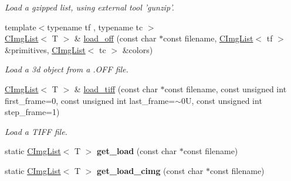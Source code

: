 \begin{DoxyCompactItemize}
\begin{DoxyCompactList}\small\item\em Load a gzipped list, using external tool 'gunzip'. \item\end{DoxyCompactList}\item 
\hypertarget{structcimg__library_1_1CImgList_abf3317799008103e710d328b5f297407}{
{\footnotesize template$<$typename tf , typename tc $>$ }\\\hyperlink{structcimg__library_1_1CImgList}{CImgList}$<$ T $>$ \& \hyperlink{structcimg__library_1_1CImgList_abf3317799008103e710d328b5f297407}{load\_\-off} (const char $\ast$const filename, \hyperlink{structcimg__library_1_1CImgList}{CImgList}$<$ tf $>$ \&primitives, \hyperlink{structcimg__library_1_1CImgList}{CImgList}$<$ tc $>$ \&colors)}
\label{structcimg__library_1_1CImgList_abf3317799008103e710d328b5f297407}

\begin{DoxyCompactList}\small\item\em Load a 3d object from a .OFF file. \item\end{DoxyCompactList}\item 
\hypertarget{structcimg__library_1_1CImgList_a9195765cb9bde15990a29ccd9306532c}{
\hyperlink{structcimg__library_1_1CImgList}{CImgList}$<$ T $>$ \& \hyperlink{structcimg__library_1_1CImgList_a9195765cb9bde15990a29ccd9306532c}{load\_\-tiff} (const char $\ast$const filename, const unsigned int first\_\-frame=0, const unsigned int last\_\-frame=$\sim$0U, const unsigned int step\_\-frame=1)}
\label{structcimg__library_1_1CImgList_a9195765cb9bde15990a29ccd9306532c}

\begin{DoxyCompactList}\small\item\em Load a TIFF file. \item\end{DoxyCompactList}\item 
\hypertarget{structcimg__library_1_1CImgList_abf9c8328ad47ecb7e15e716cecc3fd3b}{
static \hyperlink{structcimg__library_1_1CImgList}{CImgList}$<$ T $>$ {\bfseries get\_\-load} (const char $\ast$const filename)}
\label{structcimg__library_1_1CImgList_abf9c8328ad47ecb7e15e716cecc3fd3b}

\item 
\hypertarget{structcimg__library_1_1CImgList_a5d903f8df0741cf00e6c9e2f1dc8d835}{
static \hyperlink{structcimg__library_1_1CImgList}{CImgList}$<$ T $>$ {\bfseries get\_\-load\_\-cimg} (const char $\ast$const filename)}
\label{structcimg__library_1_1CImgList_a5d903f8df0741cf00e6c9e2f1dc8d835}


\end{DoxyCompactItemize}
